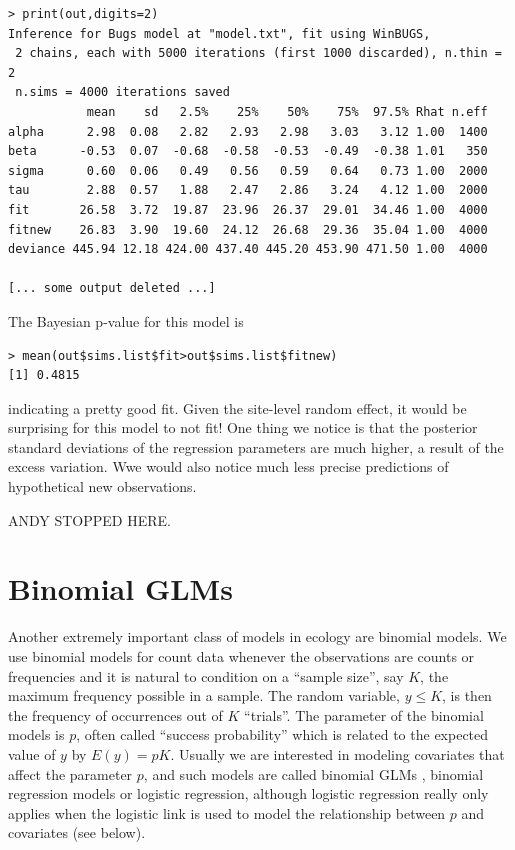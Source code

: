 {\small
\begin{verbatim}
> print(out,digits=2)
Inference for Bugs model at "model.txt", fit using WinBUGS,
 2 chains, each with 5000 iterations (first 1000 discarded), n.thin = 2
 n.sims = 4000 iterations saved
           mean    sd   2.5%    25%    50%    75%  97.5% Rhat n.eff
alpha      2.98  0.08   2.82   2.93   2.98   3.03   3.12 1.00  1400
beta      -0.53  0.07  -0.68  -0.58  -0.53  -0.49  -0.38 1.01   350
sigma      0.60  0.06   0.49   0.56   0.59   0.64   0.73 1.00  2000
tau        2.88  0.57   1.88   2.47   2.86   3.24   4.12 1.00  2000
fit       26.58  3.72  19.87  23.96  26.37  29.01  34.46 1.00  4000
fitnew    26.83  3.90  19.60  24.12  26.68  29.36  35.04 1.00  4000
deviance 445.94 12.18 424.00 437.40 445.20 453.90 471.50 1.00  4000

[... some output deleted ...]
\end{verbatim}
}
The Bayesian p-value for this model is
\begin{verbatim}
> mean(out$sims.list$fit>out$sims.list$fitnew)
[1] 0.4815
\end{verbatim}
indicating a pretty good fit. Given the site-level random effect, it
would be surprising for this model to not fit! One thing we notice is
that the posterior standard deviations of the regression parameters
are much higher, a result of the excess variation. Wwe would also
notice much less precise predictions of hypothetical new
observations.


ANDY STOPPED HERE.




\section{Binomial GLMs}

Another extremely important class of models in ecology are
binomial models. We use binomial models for count data whenever the
observations are counts or frequencies and it is natural to condition
on a ``sample size'', say $K$, the maximum frequency possible in a sample.
 The random variable, $y \le K$, is then the
frequency of occurrences out of $K$ ``trials''. The parameter of the binomial
models is $p$, often called ``success probability'' which is related
to the expected value of $y$ by $E(y) = pK$. Usually we are interested
in modeling covariates that affect the parameter $p$, and such models
are called binomial GLMs , binomial
regression models or logistic regression, although logistic regression
 really only applies when the logistic link is used to model
the relationship between $p$ and covariates (see below).

